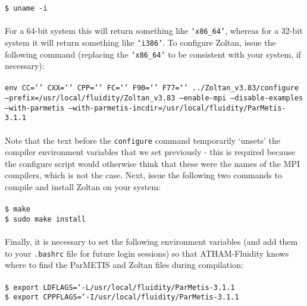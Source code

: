 \documentclass[10pt,a4paper]{article}
\newcommand\tab[1][0.5cm]{\hspace*{#1}}
\begin{document}
\tab \texttt{\$ uname -i}\\\\
For a 64-bit system this will return something like \texttt{`x86\_64'}, whereas for a 32-bit system it will return something like \texttt{`i386'}. To configure Zoltan, issue the following command (replacing the \texttt{`x86\_64'} to be consistent with your system, if necessary):\\\\
\tab \texttt{env CC=`' CXX=`' CPP=`' FC=`' F90=`' F77=`' ../Zoltan\_v3.83/configure  --prefix=/usr/local/fluidity/Zoltan\_v3.83 --enable-mpi  --disable-examples --with-parmetis  --with-parmetis-incdir=/usr/local/fluidity/ParMetis-3.1.1}\\\\
Note that the text before the \texttt{configure} command temporarily `unsets' the compiler environment variables that we set previously - this is required because the configure script would otherwise think that these were the names of the MPI compilers, which is not the case. Next, issue the following two commands to compile and install Zoltan on your system:\\\\
\tab \texttt{\$ make}\\
\tab \texttt{\$ sudo make install}\\\\
Finally, it is necessary to set the following environment variables (and add them to your \texttt{.bashrc} file for future login sessions) so that ATHAM-Fluidity knows where to find the ParMETIS and Zoltan files during compilation:\\\\
\tab \texttt{\$ export LDFLAGS=`-L/usr/local/fluidity/ParMetis-3.1.1 }\\
\tab \texttt{\$ export CPPFLAGS=`-I/usr/local/fluidity/ParMetis-3.1.1 }
\end{document}
